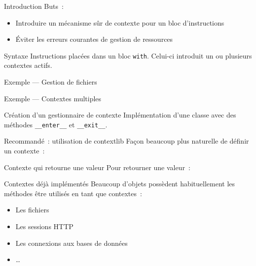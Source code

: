 \begin{frame}{Introduction}
  Buts~:
  \begin{itemize}[<+->]
    \item Introduire un mécanisme sûr de contexte pour un bloc d'instructions
    \item Éviter les erreurs courantes de gestion de ressources
  \end{itemize}
\end{frame}

\begin{frame}{Syntaxe}
  Instructions placées dans un bloc \texttt{with}. Celui-ci introduit un ou plusieurs contextes actifs.  
\end{frame}

\begin{frame}{Exemple --- Gestion de fichiers}
\end{frame}

\begin{frame}{Exemple --- Contextes multiples}
\end{frame}

\begin{frame}{Création d'un gestionnaire de contexte}
  Implémentation d'une classe avec des méthodes \texttt{\_\_enter\_\_} et \texttt{\_\_exit\_\_}.

\end{frame}

\begin{frame}{Recommandé~: utilisation de contextlib}
  Façon beaucoup plus naturelle de définir un contexte~:

\end{frame}

\begin{frame}{Contexte qui retourne une valeur}
  Pour retourner une valeur~:

\end{frame}

\begin{frame}{Contextes déjà implémentés}
  Beaucoup d'objets possèdent habituellement les méthodes être utilisés en tant que contextes~:
  \begin{itemize}[<+->]
    \item Les fichiers
    \item Les sessions HTTP
    \item Les connexions aux bases de données
    \item …
  \end{itemize}
\end{frame}

